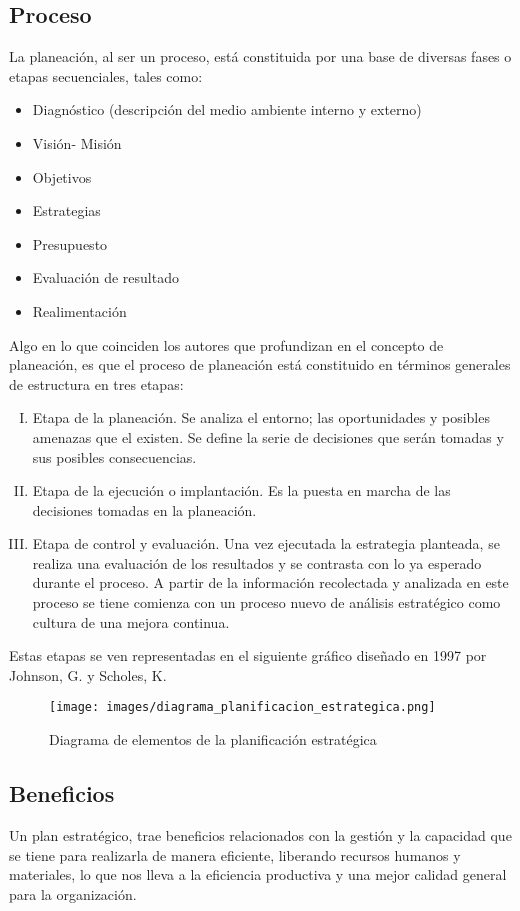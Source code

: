 \subsection{Proceso}
La planeación, al ser un proceso, está constituida por una base de diversas fases o etapas secuenciales, tales como:
\begin{itemize}
	\item Diagnóstico (descripción del medio ambiente interno y externo)
	\item Visión- Misión
	\item Objetivos
	\item Estrategias
	\item Presupuesto
	\item Evaluación de resultado
	\item Realimentación
\end{itemize}

Algo en lo que coinciden los autores que profundizan en el concepto de planeación, es que el proceso de planeación está constituido en términos generales de estructura en tres etapas:

\begin{enumerate}[I.]
	\item Etapa de la planeación. Se analiza el entorno; las oportunidades y posibles amenazas que el existen. Se define la serie de decisiones que serán tomadas y sus posibles consecuencias.
	\item Etapa de la ejecución o implantación. Es la puesta en marcha de las decisiones tomadas en la planeación.
	\item Etapa de control y evaluación. Una vez ejecutada la estrategia planteada, se realiza una evaluación de los resultados y se contrasta con lo ya esperado durante el proceso. A partir de la información recolectada y analizada en este proceso se tiene comienza con un proceso nuevo de análisis estratégico como cultura de una mejora continua.
\end{enumerate}

Estas etapas se ven representadas en el siguiente gráfico diseñado en 1997 por Johnson, G. y Scholes, K.

\begin{figure}[hbtp]
\centering
\texttt{[image: images/diagrama\_planificacion\_estrategica.png]}
\caption{Diagrama de elementos de la planificación estratégica}
\end{figure}

\subsection{Beneficios}
Un plan estratégico, trae beneficios relacionados con la gestión y la capacidad que se tiene para realizarla de manera eficiente, liberando recursos humanos y materiales, lo que nos lleva a la eficiencia productiva y una mejor calidad general para la organización.

